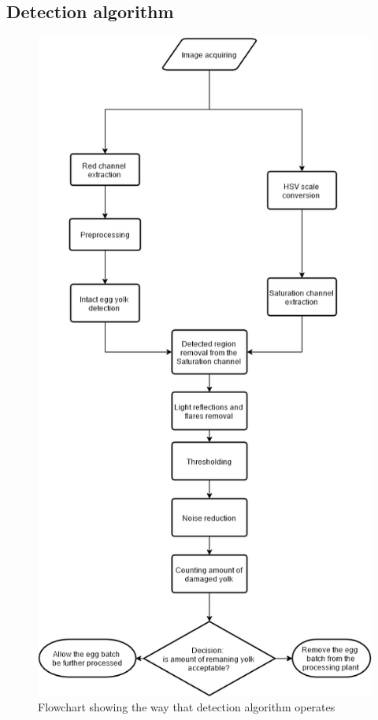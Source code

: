 \documentclass[12pt,twoside,a4paper]{article}
\begin{document}
\newpage


\subsection{Detection algorithm}
\begin{figure}[H]
\centering
\includegraphics[width=0.5\paperwidth]{algorithmV}
\caption{Flowchart showing the way that detection algorithm operates}\label{fig:algorithmV}
\end{figure}
\end{document}
